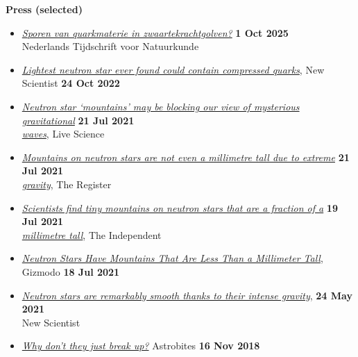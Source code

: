 \documentclass[%
    margin,
    line,
    11pt,
]{res}
\begin{document}
\begin{resume}
\textbf{Press (selected)}
\vspace*{0.05in}
\begin{itemize}
    \item[]
    \href{https://www.ntvn.nl/2025/10/sporen-van-quarkmaterie-zwaartekrachtgolven/}%
    {\textit{Sporen van quarkmaterie in zwaartekrachtgolven?}}
    \hfill \textbf{1 Oct 2025} \\
    Nederlands Tijdschrift voor Natuurkunde
    \item[]
    \href{https://www.newscientist.com/article/2343788-lightest-neutron-star-ever-found-could-contain-compressed-quarks/}%
    {\textit{Lightest neutron star ever found could contain compressed quarks}},
    New Scientist \hfill \textbf{24 Oct 2022}
    \item[]
    \href{https://www.livescience.com/millimeter-tall-neutron-star-mountains.html}%
    {\textit{Neutron star `mountains' may be blocking our view of mysterious gravitational}}
    \hfill \textbf{21 Jul 2021} \\
    \href{https://www.livescience.com/millimeter-tall-neutron-star-mountains.html}%
    {\textit{waves}}, Live Science
    \item[]
    \href{https://www.theregister.com/2021/07/21/mountain_neutron_stars/}%
    {\textit{Mountains on neutron stars are not even a millimetre tall due to extreme}}
    \hfill \textbf{21 Jul 2021} \\
    \href{https://www.theregister.com/2021/07/21/mountain_neutron_stars/}%
    {\textit{gravity}}, The Register
    \item[]
    \href{https://www.independent.co.uk/space/neutron-stars-mountains-ligo-virgo-b1886426.html}%
    {\textit{Scientists find tiny mountains on neutron stars that are a fraction of a}}
    \hfill \textbf{19 Jul 2021} \\
    \href{https://www.independent.co.uk/space/neutron-stars-mountains-ligo-virgo-b1886426.html}%
    {\textit{millimetre tall}}, The Independent
    \item[]
    \href{https://gizmodo.com/neutron-stars-have-mountains-that-are-less-than-a-milli-1847309049}%
    {\textit{Neutron Stars Have Mountains That Are Less Than a Millimeter Tall}},
    Gizmodo \hfill \textbf{18 Jul 2021}
    \item[]
    \href{https://www.newscientist.com/article/2278363-neutron-stars-are-remarkably-smooth-thanks-to-their-intense-gravity/}%
    {\textit{Neutron stars are remarkably smooth thanks to their intense gravity}},
    \hfill \textbf{24 May 2021} \\
    New Scientist
    \item[]
    \href{https://astrobites.org/2018/11/16/ns_breakup/}%
    {\textit{Why don't they just break up?}}
    Astrobites \hfill \textbf{16 Nov 2018}
\end{itemize}


\end{resume}
\end{document}
